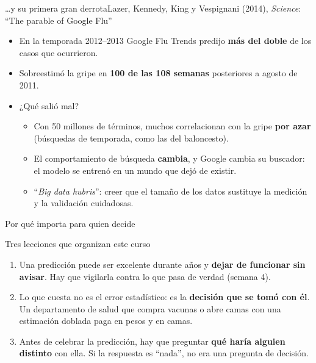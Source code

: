 \documentclass{beamer}
\begin{document}
\begin{frame}{\ldots y su primera gran derrota}{Lazer, Kennedy, King y Vespignani (2014), \emph{Science}: ``The parable of Google Flu''}
\begin{itemize}\itemsep6pt
  \item En la temporada 2012--2013 Google Flu Trends predijo \textbf{más del doble} de los casos que ocurrieron.
  \item Sobreestimó la gripe en \textbf{100 de las 108 semanas} posteriores a agosto de 2011.
  \item ¿Qué salió mal?
  \begin{itemize}
    \item Con 50 millones de términos, muchos correlacionan con la gripe \textbf{por azar} (búsquedas de temporada, como las del baloncesto).
    \item El comportamiento de búsqueda \textbf{cambia}, y Google cambia su buscador: el modelo se entrenó en un mundo que dejó de existir.
    \item ``\emph{Big data hubris}'': creer que el tamaño de los datos sustituye la medición y la validación cuidadosas.
  \end{itemize}
\end{itemize}
\end{frame}

\begin{frame}{Por qué importa para quien decide}
\begin{block}{Tres lecciones que organizan este curso}
\begin{enumerate}\itemsep4pt
  \item Una predicción puede ser excelente durante años y \textbf{dejar de funcionar sin avisar}. Hay que vigilarla contra lo que pasa de verdad (semana 4).
  \item Lo que cuesta no es el error estadístico: es la \textbf{decisión que se tomó con él}. Un departamento de salud que compra vacunas o abre camas con una estimación doblada paga en pesos y en camas.
  \item Antes de celebrar la predicción, hay que preguntar \textbf{qué haría alguien distinto} con ella. Si la respuesta es ``nada'', no era una pregunta de decisión.
\end{enumerate}
\end{block}
\end{frame}
\end{document}
